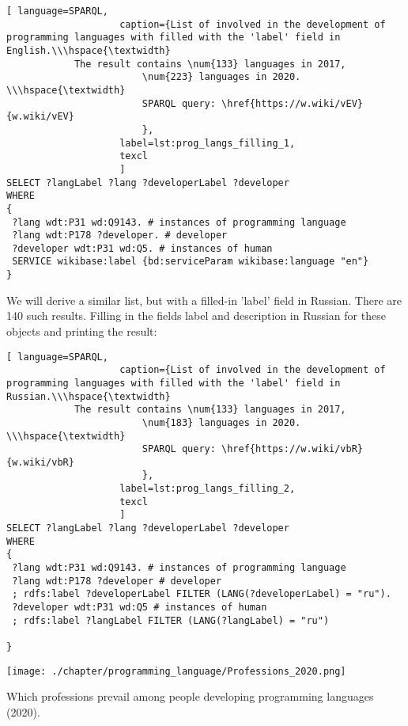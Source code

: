 \begin{lstlisting}[ language=SPARQL, 
                    caption={List of involved in the development of programming languages with filled with the 'label' field in English.\\\hspace{\textwidth}
			The result contains \num{133} languages in 2017, 
                        \num{223} languages in 2020. \\\hspace{\textwidth}
                        SPARQL query: \href{https://w.wiki/vEV}{w.wiki/vEV}
                        },
                    label=lst:prog_langs_filling_1,
                    texcl 
                    ]
SELECT ?langLabel ?lang ?developerLabel ?developer
WHERE
{
 ?lang wdt:P31 wd:Q9143. # instances of programming language
 ?lang wdt:P178 ?developer. # developer 
 ?developer wdt:P31 wd:Q5. # instances of human
 SERVICE wikibase:label {bd:serviceParam wikibase:language "en"}
}
\end{lstlisting}%

We will derive a similar list, but with a filled-in 'label' field in Russian. There are 140 such results. Filling in the fields label and description in Russian for these objects and printing the result:

\begin{lstlisting}[ language=SPARQL, 
                    caption={List of involved in the development of programming languages with filled with the 'label' field in Russian.\\\hspace{\textwidth}
			The result contains \num{133} languages in 2017, 
                        \num{183} languages in 2020. \\\hspace{\textwidth}
                        SPARQL query: \href{https://w.wiki/vbR}{w.wiki/vbR}
                        },
                    label=lst:prog_langs_filling_2,
                    texcl 
                    ]
SELECT ?langLabel ?lang ?developerLabel ?developer
WHERE
{
 ?lang wdt:P31 wd:Q9143. # instances of programming language
 ?lang wdt:P178 ?developer # developer 
 ; rdfs:label ?developerLabel FILTER (LANG(?developerLabel) = "ru").
 ?developer wdt:P31 wd:Q5 # instances of human
 ; rdfs:label ?langLabel FILTER (LANG(?langLabel) = "ru")
 
}
\end{lstlisting}%
\begin{marginfigure}[-45pt]
	\texttt{[image: ./chapter/programming\_language/Professions\_2020.png]}
	\caption{Which professions prevail among people developing programming languages (2020).}
	\label{fig:Professions_2020}
\end{marginfigure}

